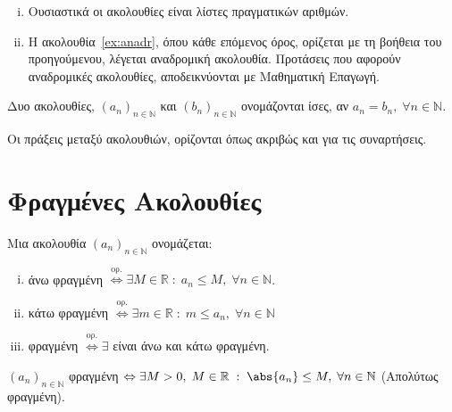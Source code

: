 \documentclass[main.tex]{subfiles}
\begin{document}
\begin{rem}
\item {}
    \begin{enumerate}[i)]
        \item Ουσιαστικά οι ακολουθίες είναι λίστες πραγματικών αριθμών.
        \item Η ακολουθία~\ref{ex:anadr}, όπου κάθε επόμενος όρος,
            ορίζεται με τη βοήθεια του προηγούμενου, λέγεται
            \textcolor{Col\thechapter}{αναδρομική ακολουθία}. 
            Προτάσεις που αφορούν αναδρομικές ακολουθίες, 
            αποδεικνύονται με Μαθηματική Επαγωγή.
    \end{enumerate}
\end{rem}

\begin{dfn}
    Δυο ακολουθίες, $(a_{n})_{n \in \mathbb{N}}$  και $ (b_{n})_{n \in 
    \mathbb{N}} $ ονομάζονται \textcolor{Col\thechapter}{ίσες}, αν $ a_{n} 
    = b_{n}, \; \forall n \in \mathbb{N} $.
\end{dfn}

\begin{dfn}
    Οι πράξεις μεταξύ ακολουθιών, ορίζονται όπως ακριβώς και για τις 
    συναρτήσεις.
\end{dfn}

\section{Φραγμένες Ακολουθίες}

\begin{dfn}
\item {}
    Μια ακολουθία $ (a_{n})_{n \in \mathbb{N}} $ ονομάζεται:
    \begin{enumerate}[i)]
        \item \textcolor{Col\thechapter}{άνω φραγμένη} 
            $ \overset{\text{ορ.}}{\Leftrightarrow} \exists M \in 
            \mathbb{R} \; : \; a_{n} \leq M, \; \forall n \in \mathbb{N}$.
        \item \textcolor{Col\thechapter}{κάτω φραγμένη} 
            $ \overset{\text{ορ.}}{\Leftrightarrow} \exists m \in 
            \mathbb{R} \; : \; m \leq a_{n}, \; \forall n \in \mathbb{N}  $
        \item \textcolor{Col\thechapter}{φραγμένη} 
            $ \overset{\text{ορ.}}{\Leftrightarrow} \exists$ 
            είναι άνω και κάτω φραγμένη.
    \end{enumerate}

    \begin{prop}
        $ (a_{n})_{n \in \mathbb{N}} $ φραγμένη $ \Leftrightarrow \exists 
        M>0, \; M \in \mathbb{R} \; : \; \abs{a_{n}} \leq M, \; \forall 
        n \in \mathbb{N} $
        (Απολύτως φραγμένη).
    \end{prop}
\end{dfn}
\end{document}
